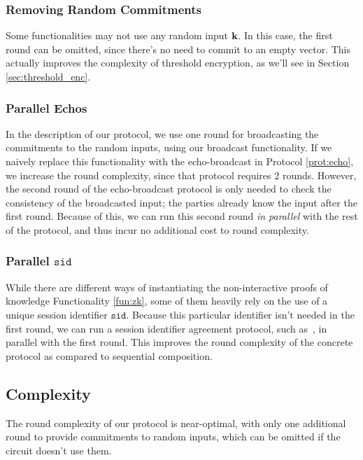 \subsubsection{Removing Random Commitments}

Some functionalities may not use any random input $\textbf{k}$.
In this case, the first round can be omitted, since there's
no need to commit to an empty vector.
This actually improves the complexity of threshold encryption,
as we'll see in Section \ref{sec:threshold_enc}.

\subsubsection{Parallel Echos}

In the description of our protocol, we use one round for broadcasting
the commitments to the random inputs, using our broadcast functionality.
If we naively replace this functionality with the
echo-broadcast in Protocol \ref{prot:echo},
we increase the round complexity, since that protocol requires 2 rounds.
However, the second round of the echo-broadcast protocol is only
needed to check the consistency of the broadcasted input; the parties
already know the input after the first round.
Because of this, we can run this second round \emph{in parallel}
with the rest of the protocol, and thus incur no additional
cost to round complexity. 

\subsubsection{Parallel $\texttt{sid}$}

While there are different ways of instantiating
the non-interactive proofs of knowledge Functionality \ref{fun:zk}, some of them
heavily rely on the use of a unique session identifier $\texttt{sid}$.
Because this particular identifier isn't needed in the first round,
we can run a session identifier agreement protocol,
such as~\cite{barak_protocol_2004}, in parallel with the first round.
This improves the round complexity of the concrete protocol as
compared to sequential composition.

\subsection{Complexity}

The round complexity of our protocol is near-optimal, with
only one additional round to provide commitments to random inputs,
which can be omitted if the circuit doesn't use them.

